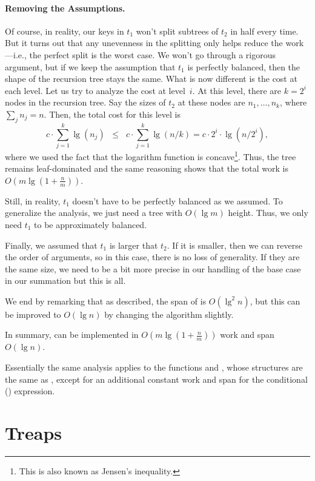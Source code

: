\paragraph{Removing the Assumptions.}

Of course, in reality, our keys in $t_1$ won't split subtrees of $t_2$
in half every time.  But it turns out that any unevenness in the
splitting only helps reduce the work---i.e., the perfect split is the
worst case.  We won't go through a rigorous argument, but if we keep
the assumption that $t_1$ is perfectly balanced, then the shape of the
recursion tree stays the same.  What is now different is the cost at
each level.  Let us try to analyze the cost at level~$i$.  At this
level, there are $k = 2^i$ nodes in the recursion tree. Say the sizes
of $t_2$ at these nodes are $n_1, \dots, n_k$, where $\sum_j n_j =
n$. Then, the total cost for this level is
\[
c \cdot \sum_{j=1}^k \lg (n_j) \;\;\leq\;\; c \cdot \sum_{j=1}^k \lg (n/k) =
c\cdot 2^i \cdot \lg (n/2^i),
\]
where we used the fact that the logarithm function is
concave\footnote{This is also known as Jensen's inequality.}.  Thus,
the tree remains leaf-dominated and the same reasoning shows that the
total work is $O(m \lg (1 + \frac{n}{m}))$.

Still, in reality, $t_1$ doesn't have to be perfectly balanced as we
assumed. To generalize the analysis, we just need a tree with
$O(\lg{m})$ height.  Thus, we only need $t_1$ to be approximately
balanced. 

Finally, we assumed that $t_1$ is larger that $t_2$.  If it is
smaller, then we can reverse the order of arguments, so in this case,
there is no loss of generality.  If they are the same size, we need to
be a bit more precise in our handling of the base case in our
summation but this is all.

We end by remarking that as described, the span of \cunion{} is
$O(\lg^2 n)$, but this can be improved to $O(\lg n)$ by changing the
algorithm slightly.

In summary, \cunion{} can be implemented in $O(m \lg (1 +
\tfrac{n}m))$ work and span $O(\lg n)$.  

Essentially the same analysis applies to the functions
 and , whose structures are the same
as , except for an additional constant work and span for
the conditional () expression.
 
\section{Treaps}
\label{sec:bst::treaps}

